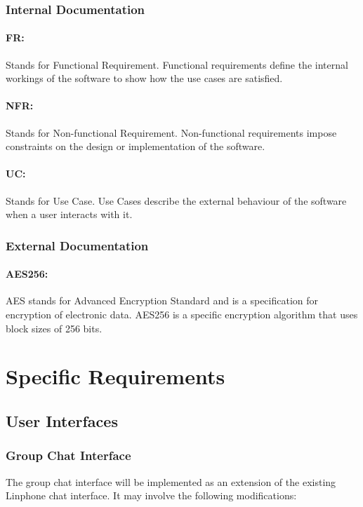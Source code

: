 \documentclass[11pt]{article}
\begin{document}
\subsubsection{Internal Documentation}
\paragraph{FR:}
 Stands for Functional Requirement. Functional requirements define the internal workings of the software to show how the use cases are satisfied.
\paragraph{NFR:} Stands for Non-functional Requirement. Non-functional requirements impose constraints on the design or implementation of the software.
\paragraph{UC:} Stands for Use Case. Use Cases describe the external behaviour of the software when a user interacts with it.
\subsubsection{External Documentation}
\paragraph{AES256:} AES stands for Advanced Encryption Standard and is a specification for encryption of electronic data. AES256 is a specific encryption algorithm that uses block sizes of 256 bits.

\section{Specific Requirements}
\subsection{User Interfaces}
\subsubsection{Group Chat Interface} The group chat interface will be implemented as an extension of the existing Linphone chat interface. It may involve the following modifications:
\end{document}
